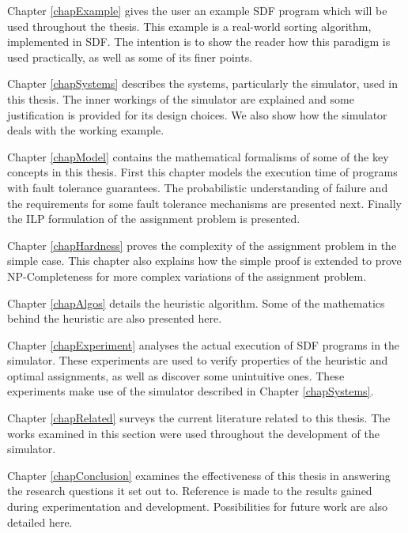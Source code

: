 Chapter \ref{chapExample} gives the user an example SDF program which will be used throughout the thesis.
This example is a real-world sorting algorithm, implemented in SDF.
The intention is to show the reader how this paradigm is used practically, as well as some of its finer points.

Chapter \ref{chapSystems} describes the systems, particularly the simulator, used in this thesis.
The inner workings of the simulator are explained and some justification is provided for its design choices.
We also show how the simulator deals with the working example.

Chapter \ref{chapModel} contains the mathematical formalisms of some of the key concepts in this thesis.
First this chapter models the execution time of programs with fault tolerance guarantees.
The probabilistic understanding of failure and the requirements for some fault tolerance mechanisms are presented next.
Finally the ILP formulation of the assignment problem is presented.

Chapter \ref{chapHardness} proves the complexity of the assignment problem in the simple case.
This chapter also explains how the simple proof is extended to prove NP-Completeness for more complex variations of the assignment problem.

Chapter \ref{chapAlgos} details the heuristic algorithm.
Some of the mathematics behind the heuristic are also presented here.

Chapter \ref{chapExperiment} analyses the actual execution of SDF programs in the simulator.
These experiments are used to verify properties of the heuristic and optimal assignments, as well as discover some unintuitive ones.
These experiments make use of the simulator described in Chapter \ref{chapSystems}.

Chapter \ref{chapRelated} surveys the current literature related to this thesis.
The works examined in this section were used throughout the development of the simulator.

Chapter \ref{chapConclusion} examines the effectiveness of this thesis in answering the research questions it set out to.
Reference is made to the results gained during experimentation and development.
Possibilities for future work are also detailed here.